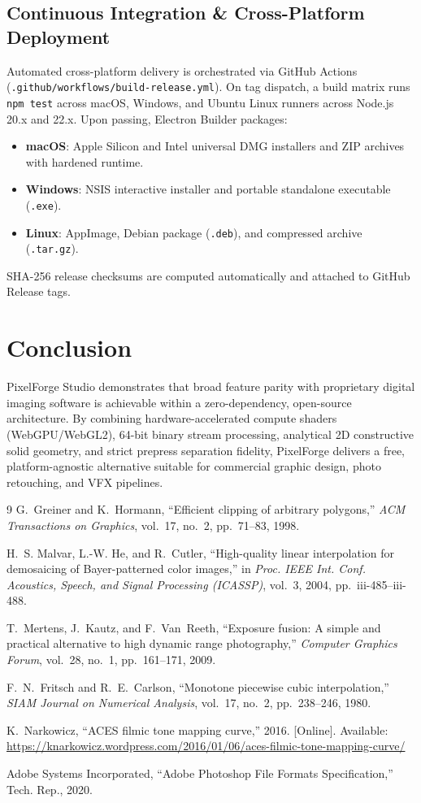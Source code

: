 \documentclass[10pt,journal,compsoc]{IEEEtran}
\begin{document}
\subsection{Continuous Integration \& Cross-Platform Deployment}
Automated cross-platform delivery is orchestrated via GitHub Actions (\texttt{.github/workflows/build-release.yml}). On tag dispatch, a build matrix runs \texttt{npm test} across macOS, Windows, and Ubuntu Linux runners across Node.js 20.x and 22.x. Upon passing, Electron Builder packages:
\begin{itemize}
    \item \textbf{macOS}: Apple Silicon and Intel universal DMG installers and ZIP archives with hardened runtime.
    \item \textbf{Windows}: NSIS interactive installer and portable standalone executable (\texttt{.exe}).
    \item \textbf{Linux}: AppImage, Debian package (\texttt{.deb}), and compressed archive (\texttt{.tar.gz}).
\end{itemize}
SHA-256 release checksums are computed automatically and attached to GitHub Release tags.

\section{Conclusion}
PixelForge Studio demonstrates that broad feature parity with proprietary digital imaging software is achievable within a zero-dependency, open-source architecture. By combining hardware-accelerated compute shaders (WebGPU/WebGL2), 64-bit binary stream processing, analytical 2D constructive solid geometry, and strict prepress separation fidelity, PixelForge delivers a free, platform-agnostic alternative suitable for commercial graphic design, photo retouching, and VFX pipelines.

\begin{thebibliography}{9}
G.~Greiner and K.~Hormann, ``Efficient clipping of arbitrary polygons,'' \emph{ACM Transactions on Graphics}, vol.~17, no.~2, pp.~71--83, 1998.

H.~S. Malvar, L.-W. He, and R.~Cutler, ``High-quality linear interpolation for demosaicing of Bayer-patterned color images,'' in \emph{Proc. IEEE Int. Conf. Acoustics, Speech, and Signal Processing (ICASSP)}, vol.~3, 2004, pp.~iii-485--iii-488.

T.~Mertens, J.~Kautz, and F.~Van~Reeth, ``Exposure fusion: A simple and practical alternative to high dynamic range photography,'' \emph{Computer Graphics Forum}, vol.~28, no.~1, pp.~161--171, 2009.

F.~N.~Fritsch and R.~E.~Carlson, ``Monotone piecewise cubic interpolation,'' \emph{SIAM Journal on Numerical Analysis}, vol.~17, no.~2, pp.~238--246, 1980.

K.~Narkowicz, ``ACES filmic tone mapping curve,'' 2016. [Online]. Available: \url{https://knarkowicz.wordpress.com/2016/01/06/aces-filmic-tone-mapping-curve/}

Adobe Systems Incorporated, ``Adobe Photoshop File Formats Specification,'' Tech. Rep., 2020.
\end{thebibliography}
\end{document}
